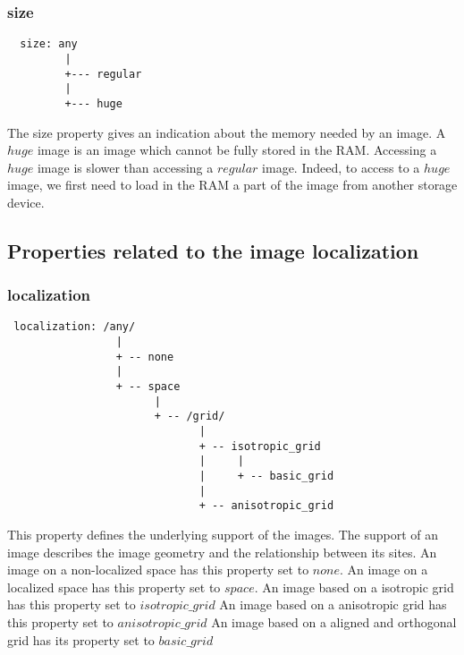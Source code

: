 
\subsubsection{size}

\begin{verbatim}
  size: any
         |
         +--- regular
         |
         +--- huge
\end{verbatim}


The size property gives an indication about the memory needed by an image.
A $huge$ image is an image which cannot be fully stored in the RAM.
Accessing a $huge$ image is slower than accessing a $regular$ image.
Indeed, to access to a $huge$ image, we first need to load in the RAM a part of
the image from another storage device.

\subsection{Properties related to the image localization}

\subsubsection{localization}

\begin{verbatim}
 localization: /any/
                 |
                 + -- none
                 |
                 + -- space
                       |
                       + -- /grid/
                              |
                              + -- isotropic_grid
                              |     |
                              |     + -- basic_grid
                              |
                              + -- anisotropic_grid

\end{verbatim}

This property defines the underlying support of the images.
The support of an image describes the image geometry and the relationship
between its sites.
An image on a non-localized space has this property set to $none$.
An image on a localized space has this property set to $space$.
An image based on a isotropic grid has this property set to $isotropic\_grid$
An image based on a anisotropic grid has this property set to
$anisotropic\_grid$
An image based on a aligned and orthogonal grid has its property set to
$basic\_grid$

